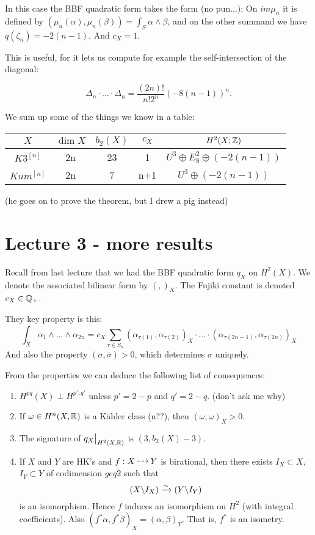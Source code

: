 \documentclass[11pt, english]{article}
\begin{document}
In this case the BBF quadratic form takes the form (no pun...): On $im \mu_n$ it is defined by $(\mu_n(\alpha),\mu_n(\beta)) = \int_S \alpha \wedge \beta$, and on the other summand we have $q(\zeta_n) = -2(n-1)$. And $c_X = 1$. 

This is useful, for it lets us compute for example the self-intersection of the diagonal:

$$
\Delta_n \cdot \ldots \cdot \Delta_n = \frac{(2n)!}{n! 2^n} (-8(n-1))^n.
$$

We sum up some of the things we know in a table:
\begin{center}
\begin{tabular}{c | c | c | c | c}
$X$ & $\dim X$ & $b_2(X)$ & $c_X$ & $H^2(X; \mathbb{Z})$ \\
\hline 
$K3^{[n]}$ & 2n & 23 & 1 & $U^3 \oplus E_8^2 \oplus (-2(n-1))$ \\
$Kum^{[n]}$ & 2n & 7 & n+1 & $U^3 \oplus (-2(n-1))$ 
\end{tabular}
\end{center}

(he goes on to prove the theorem, but I drew a pig instead)

\section{Lecture 3 - more results}

Recall from last lecture that we had the BBF quadratic form $q_X$ on $H^2(X)$. We denote the associated bilinear form by $(,)_X$. The Fujiki constant is denoted $c_X \in \mathbb{Q}_+$.

They key property is this:
$$
\int_X \alpha_1 \wedge \ldots \wedge \alpha_{2n} = c_X \sum_{\tau \in S_n} (\alpha_{\tau(1)}, \alpha_{\tau(2)})_X \cdot \ldots \cdot (\alpha_{\tau(2n-1)}, \alpha_{\tau(2n)})_X
$$
And also the property $(\sigma,\overline \sigma) > 0$, which determines $\sigma$ uniquely.

From the properties we can deduce the following list of consequences:
\begin{enumerate}
	\item $H^{pq}(X) \perp H^{p',q'}$ unless $p'=2-p$ and $q'=2-q$.  (don't ask me why)
	\item If $\omega \in H^n(X,\mathbb{R})$ is a Kähler class (n??), then $(\omega,\omega)_X > 0$.
	\item The signature of $\restr{q_X}{H^2(X,\R)}$ is $(3,b_2(X)-3)$.
	\item If $X$ and $Y$ are HK's and $f:X \rmap Y$ is birational, then there exists $I_X \subset X$, $I_Y \subset Y$ of codimension $geq 2$ such that 
	$$
(X \backslash I_X) \xrightarrow{\sim} (Y \backslash I_Y)
	$$
	is an isomorphism. Hence $f$ induces an isomorphism on $H^2$ (with integral coefficients). Also $(f^\ast \alpha, f^\ast \beta)_X= ( \alpha, \beta)_Y$. That is, $f^\ast$ is an isometry.
\end{enumerate}
\end{document}
